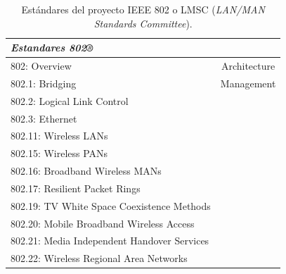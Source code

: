 

\vspace{10px}

\begin{table}[ht]
	\centering
	\caption{Estándares del proyecto IEEE 802 o LMSC (\textit{LAN/MAN Standards Committee}).}
	\begin{tabular}{@{} l *1c @{}}    \toprule
		\emph{\textbf{Estandares 802®}} \\
		\midrule
        802: Overview & Architecture\\
        802.1: Bridging & Management\\
        802.2: Logical Link Control\\
        802.3: Ethernet\\
        802.11: Wireless LANs\\
        802.15: Wireless PANs\\
        802.16: Broadband Wireless MANs\\
        802.17: Resilient Packet Rings\\
        802.19: TV White Space Coexistence Methods\\
        802.20: Mobile Broadband Wireless Access\\
        802.21: Media Independent Handover Services\\
        802.22: Wireless Regional Area Networks\\
		\bottomrule
		\hline
	\end{tabular}
	\label{tab:802}
\end{table}

